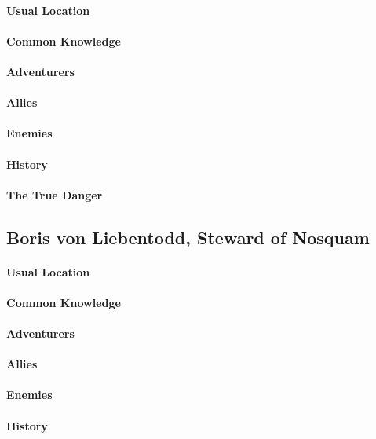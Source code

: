 \begin{multicols}{2}
    \paragraph{Usual Location}
    \paragraph{Common Knowledge} 
    \paragraph{Adventurers}
    \paragraph{Allies}
    \paragraph{Enemies}
    \paragraph{History}
    \paragraph{The True Danger}
          
\subsection{Boris von Liebentodd, Steward of Nosquam}
    \paragraph{Usual Location}
    \paragraph{Common Knowledge} 
    \paragraph{Adventurers}
    \paragraph{Allies}
    \paragraph{Enemies}
    \paragraph{History}

\end{multicols}
